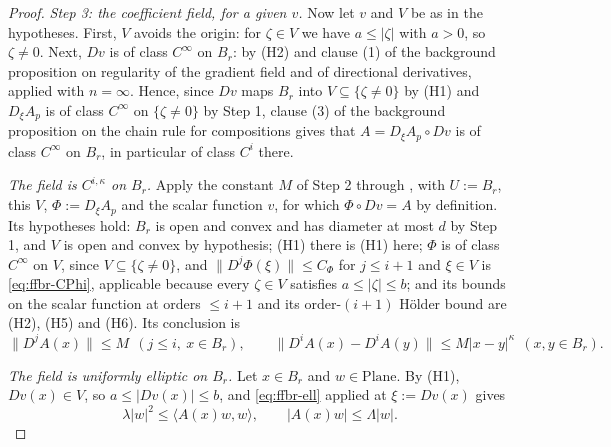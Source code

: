 \begin{proof}
\medskip\noindent\emph{Step 3: the coefficient field, for a given $v$.}
Now let $v$ and $V$ be as in the hypotheses.  First, $V$ avoids the origin: for $\zeta\in V$ we
have $a\le\lvert\zeta\rvert$ with $a>0$, so $\zeta\ne0$.  Next, $Dv$ is of class $C^{\infty}$ on
$B_r$: by (H2) and clause (1) of the background proposition on regularity of the gradient field
and of directional derivatives, applied with $n=\infty$.  Hence, since $Dv$ maps $B_r$ into
$V\subseteq\{\zeta\ne0\}$ by (H1) and $D_\xi A_p$ is of class $C^{\infty}$ on $\{\zeta\ne0\}$ by
Step 1, clause (3) of the background proposition on the chain rule for compositions gives that
$A=D_\xi A_p\circ Dv$ is of class $C^{\infty}$ on $B_r$, in particular of class $C^{i}$ there.

\emph{The field is $C^{i,\kappa}$ on $B_r$.}  Apply the constant $M$ of Step 2 through
, with $U:=B_r$, this $V$, $\Phi:=D_\xi A_p$ and the scalar
function $v$, for which $\Phi\circ Dv=A$ by definition.  Its hypotheses hold: $B_r$ is open and
convex and has diameter at most $d$ by Step 1, and $V$ is open and convex by hypothesis; (H1)
there is (H1) here; $\Phi$ is of class $C^{\infty}$ on $V$, since $V\subseteq\{\zeta\ne0\}$, and
$\lVert D^{j}\Phi(\xi)\rVert\le C_\Phi$ for $j\le i+1$ and $\xi\in V$ is \eqref{eq:ffbr-CPhi},
applicable because every $\zeta\in V$ satisfies $a\le\lvert\zeta\rvert\le b$; and its bounds on
the scalar function at orders $\le i+1$ and its order-$(i+1)$ H\"older bound are (H2), (H5) and
(H6).  Its conclusion is
\begin{equation}\label{eq:ffbr-coeff}
  \bigl\lVert D^{j}A(x)\bigr\rVert\le M\ \ (j\le i,\ x\in B_r),
  \qquad
  \bigl\lVert D^{i}A(x)-D^{i}A(y)\bigr\rVert\le M\lvert x-y\rvert^{\kappa}\ \ (x,y\in B_r).
\end{equation}

\emph{The field is uniformly elliptic on $B_r$.}  Let $x\in B_r$ and $w\in\mathrm{Plane}$.  By
(H1), $Dv(x)\in V$, so $a\le\lvert Dv(x)\rvert\le b$, and \eqref{eq:ffbr-ell} applied at
$\xi:=Dv(x)$ gives
\begin{equation}\label{eq:ffbr-ellA}
  \lambda\lvert w\rvert^{2}\le\bigl\langle A(x)w,w\bigr\rangle,
  \qquad
  \lvert A(x)w\rvert\le\Lambda\lvert w\rvert .
\end{equation}


\end{proof}
